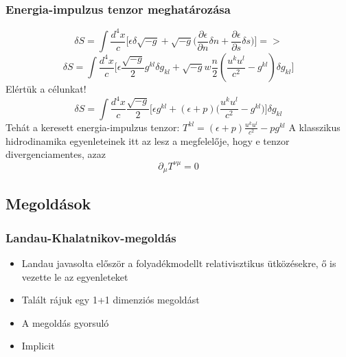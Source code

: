 \documentclass{beamer}
\begin{document}
\begin{frame}
\frametitle{Energia-impulzus tenzor meghatározása}
\begin{equation*}
\delta S=\int \frac{d^4 x}{c}\bigg[\epsilon \delta \sqrt{-g}+\sqrt{-g}\bigg(\frac{\partial\epsilon}{\partial n}\delta n+\frac{\partial \epsilon}{\partial s}\delta s\bigg)\bigg]=>
\end{equation*}
\begin{equation*}
\delta S=\int \frac{d^4 x}{c}\bigg[\epsilon\frac{\sqrt{-g}}{2}g^{kl}\delta g_{kl}+\sqrt{-g}w\frac{n}{2}(\frac{u^ku^l}{c^2}-g^{kl})\delta g_{kl}\bigg]
\end{equation*}
Elértük a célunkat! 
\begin{equation*}
\delta S=\int \frac{d^4 x}{c}\frac{\sqrt{-g}}{2}\bigg[\epsilon g^{kl}+(\epsilon+p)\bigg(\frac{u^ku^l}{c^2}-g^{kl}\bigg)\bigg]\delta g_{kl}
\end{equation*}
Tehát a keresett energia-impulzus tenzor: $T^{kl}=(\epsilon+p)\frac{u^ku^l}{c^2}-pg^{kl}$
A klasszikus hidrodinamika egyenleteinek itt az lesz a megfelelője, hogy e tenzor divergenciamentes, azaz 
\begin{equation*}
\partial_{\mu}T^{\nu\mu}=0
\end{equation*}
\end{frame}


\subsection{Megoldások}

\begin{frame}
\frametitle{Landau-Khalatnikov-megoldás}
\begin{itemize}
\item Landau javasolta először a folyadékmodellt relativisztikus ütközésekre, ő is vezette le az egyenleteket
\item Talált rájuk egy 1+1 dimenziós megoldást
\item A megoldás gyorsuló
\item Implicit
\end{itemize}
\end{frame}
\end{document}
